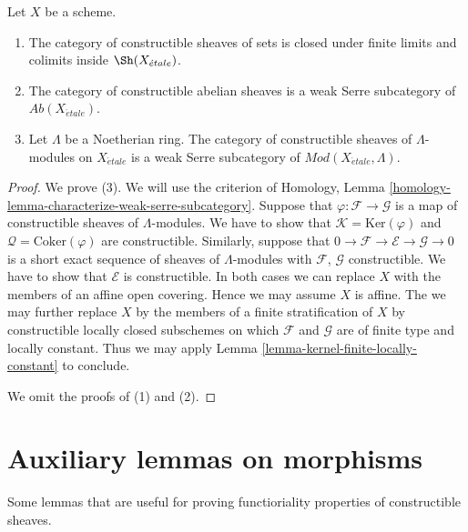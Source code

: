 \begin{lemma}
\label{lemma-constructible-abelian}
Let $X$ be a scheme.
\begin{enumerate}
\item The category of constructible sheaves of sets
is closed under finite limits and colimits inside $\Sh(X_{\acute{e}tale})$.
\item The category of constructible abelian sheaves is a
weak Serre subcategory of $\textit{Ab}(X_{\acute{e}tale})$.
\item Let $\Lambda$ be a Noetherian ring. The category of
constructible sheaves of $\Lambda$-modules on
$X_{\acute{e}tale}$ is a weak Serre subcategory of
$\textit{Mod}(X_{\acute{e}tale}, \Lambda)$.
\end{enumerate}
\end{lemma}

\begin{proof}
We prove (3). We will use the criterion of
Homology, Lemma \ref{homology-lemma-characterize-weak-serre-subcategory}.
Suppose that $\varphi : \mathcal{F} \to \mathcal{G}$
is a map of constructible sheaves of $\Lambda$-modules.
We have to show that $\mathcal{K} = \text{Ker}(\varphi)$ and
$\mathcal{Q} = \text{Coker}(\varphi)$ are constructible. 
Similarly, suppose that
$0 \to \mathcal{F} \to \mathcal{E} \to \mathcal{G} \to 0$
is a short exact sequence of sheaves of $\Lambda$-modules
with $\mathcal{F}$, $\mathcal{G}$ constructible. We have to show
that $\mathcal{E}$ is constructible.
In both cases we can replace $X$ with the members of an
affine open covering. Hence we may assume $X$ is affine.
The we may further replace $X$ by the members of a finite
stratification of $X$ by constructible locally closed subschemes
on which $\mathcal{F}$ and $\mathcal{G}$ are of finite type and
locally constant. Thus we may apply
Lemma \ref{lemma-kernel-finite-locally-constant} to conclude.

\medskip\noindent
We omit the proofs of (1) and (2).
\end{proof}





\section{Auxiliary lemmas on morphisms}
\label{section-stratify-morphisms}

\noindent
Some lemmas that are useful for proving functioriality properties
of constructible sheaves.

